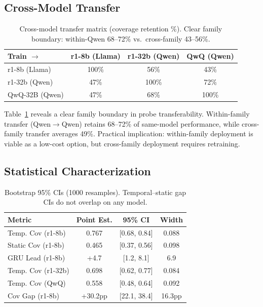 \documentclass[11pt,a4paper]{article}
\begin{document}
\subsection{Cross-Model Transfer}
\label{sec:transfer}

\begin{table}[t]
\centering
\small
\begin{tabular}{lccc}
\toprule
Train $\rightarrow$ & r1-8b (Llama) & r1-32b (Qwen) & QwQ (Qwen) \\
\midrule
r1-8b (Llama) & 100\% & 56\% & 43\% \\
r1-32b (Qwen) & 47\% & 100\% & 72\% \\
QwQ-32B (Qwen) & 47\% & 68\% & 100\% \\
\bottomrule
\end{tabular}
\caption{Cross-model transfer matrix (coverage retention \%). Clear family boundary: within-Qwen 68--72\% vs.\ cross-family 43--56\%.}
\label{tab:transfer}
\end{table}

Table~\ref{tab:transfer} reveals a clear family boundary in probe transferability. Within-family transfer (Qwen$\rightarrow$Qwen) retains 68--72\% of same-model performance, while cross-family transfer averages 49\%. Practical implication: within-family deployment is viable as a low-cost option, but cross-family deployment requires retraining.

\subsection{Statistical Characterization}
\label{sec:bootstrap}

\begin{table}[t]
\centering
\small
\begin{tabular}{lccc}
\toprule
Metric & Point Est. & 95\% CI & Width \\
\midrule
Temp. Cov (r1-8b) & 0.767 & [0.68, 0.84] & 0.088 \\
Static Cov (r1-8b) & 0.465 & [0.37, 0.56] & 0.098 \\
GRU Lead (r1-8b) & +4.7 & [1.2, 8.1] & 6.9 \\
Temp. Cov (r1-32b) & 0.698 & [0.62, 0.77] & 0.084 \\
Temp. Cov (QwQ) & 0.558 & [0.48, 0.64] & 0.092 \\
Cov Gap (r1-8b) & +30.2pp & [22.1, 38.4] & 16.3pp \\
\bottomrule
\end{tabular}
\caption{Bootstrap 95\% CIs (1000 resamples). Temporal--static gap CIs do not overlap on any model.}
\label{tab:bootstrap}
\end{table}
\end{document}
